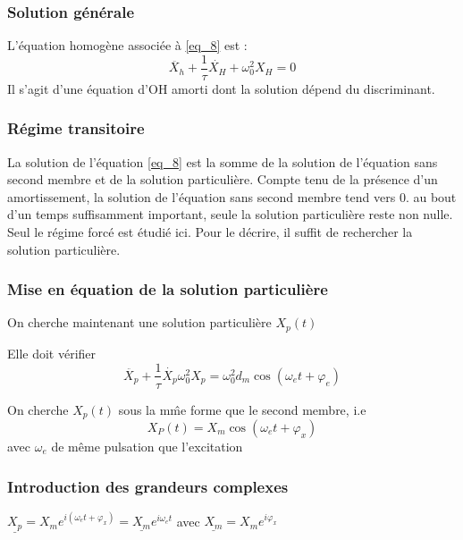 \documentclass[french]{yLectureNote}
\begin{document}
\subsubsection{Solution générale}
L'équation homogène associée à \eqref{eq_8} est :
\begin{equation}
\ddot{X_h} + \frac{1}{\tau}\dot{X_H} + \omega_0^2X_H  = 0\label{eq_h_2}
\end{equation}
Il s'agit d'une équation d'OH amorti dont la solution dépend du discriminant.
\subsubsection{Régime transitoire}
La solution de l’équation \eqref{eq_8} est la somme de la solution de l’équation sans second membre
et de la solution particulière. Compte tenu de la présence d’un amortissement, la solution
de l’équation sans second membre tend vers 0. au bout d’un temps suffisamment important,
seule la solution particulière reste non nulle. Seul le régime forcé
est étudié ici. Pour le décrire, il suffit de rechercher la solution particulière.
\subsubsection{Mise en équation de la solution particulière}
On cherche maintenant une solution particulière $X_p(t)$

Elle doit vérifier
\begin{equation}
 \ddot{X_p} + \frac{1}{\tau}\dot{X_p} \omega_0^2X_p = \omega_0^2 d_m \cos(\omega_e t + \varphi_e)\label{eq_6}
\end{equation}



On cherche $X_p(t)$ sous la m\^me forme que le second membre, i.e \begin{equation}
                                                               X_P(t) = X_m\cos(\omega_et+\varphi_x)
                                                              \end{equation}
avec $\omega_e$ de m\^eme pulsation que l'excitation

\subsubsection{Introduction des grandeurs complexes}
$\underline{X_p} = X_me^{i(\omega_e t + \varphi_x)} = \underline{X_m} e^{i\omega_e t}$ avec $\underline{X_m} =  X_me^{i\varphi_x}$
\end{document}
